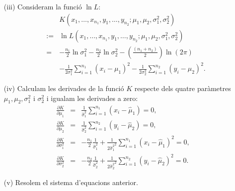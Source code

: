 {\begin{itemize}
\begin{itemize}
\begin{eqnarray*}
	 & &L (x_1,\ldots,x_{n_1},y_1,\ldots,y_{n_2};\mu_1,\mu_2,\sigma_1^2,\sigma_2^2) 
	 =  \prod_{i=1}^{n_1} 
	f_{X} (x_i)\cdot\prod_{i=1}^{n_2} f_Y (y_i)\\ & = & 
	\frac{1}{\sigma_1^{n_1}\sigma_2^{n_2}{(2\pi)}^{\frac{n_1+n_2}{2}}} 
	\e^{-\frac{1}{2\sigma_1^2}\sum\limits_{i=1}^{n_1} {(x_i -\mu_1)}^2 -
	\frac{1}{2\sigma_2^2}\sum\limits_{i=1}^{n_2} {(y_i -\mu_2)}^2}.
    \end{eqnarray*}
	
	\item[(iii)] Consideram la funci\'o $\ln L$:
\begin{eqnarray*}
	& & K (x_1,\ldots,x_{n_1},y_1,\ldots,y_{n_2};\mu_1,\mu_2,\sigma_1^2,\sigma_2^2)
	\\ & := & \ln L 
	(x_1,\ldots,x_{n_1},y_1,\ldots,y_{n_2};\mu_1,\mu_2,\sigma_1^2,\sigma_2^2) 
	\\  & = & -\frac{n_1}{2}\ln\sigma_1^2 -\frac{n_2}{2}\ln\sigma_2^2 
	-\left(\frac{(n_1+n_2)}{2}\right)\ln 
	(2\pi) \\ &&-\frac{1}{2\sigma_1^2}\sum\limits_{i=1}^{n_1} {(x_i -\mu_1)}^2
	-\frac{1}{2\sigma_2^2}\sum\limits_{i=1}^{n_2} {(y_i -\mu_2)}^2.
\end{eqnarray*}	
	
	\item[(iv)] Calculam les derivades de la funci\'o $K$ respecte dels quatre 
	par\`ametres $\mu_1,\mu_2,\sigma_1^2$ i $\sigma_2^2$ i igualam les 
	derivades a zero:
	\begin{eqnarray}
		\frac{\partial K}{\partial \mu_1} & = & 
		\frac{1}{\hat{\sigma}_1^2}\sum_{i=1}^{n_1} (x_i -\hat{\mu}_1) =0, 
		\label{MU1}\\
			\frac{\partial K}{\partial \mu_2} & = & 
			\frac{1}{\hat{\sigma}_2^2}\sum_{i=1}^{n_2} (y_i -
\hat{\mu}_2) =0, 
			\label{MU2} \\
		\frac{\partial K}{\partial \sigma_1^2} & = & 
		-\frac{n_1}{2}\frac{1}{\hat{\sigma}_1^2} 
		+\frac{1}{2{\hat{\sigma}_1^2 {}}^2} \sum_{i=1}^{n_1} {(x_i-
\hat{\mu}_1)}^2 
		= 0, \label{SIGMA1}\\
	\frac{\partial K}{\partial \sigma_2^2} & = & 
		-\frac{n_2}{2}\frac{1}{\hat{\sigma}_2^2} 
		+\frac{1}{2{\hat{\sigma}_2^2 {}}^2} \sum_{i=1}^{n_2} {(y_i-
\hat{\mu}_2)}^2 
		= 0.\label{SIGMA2}
	\end{eqnarray}
	
	\item[(v)] Resolem el sistema d'equacions anterior. 
	

\end{itemize}
\end{itemize}}
